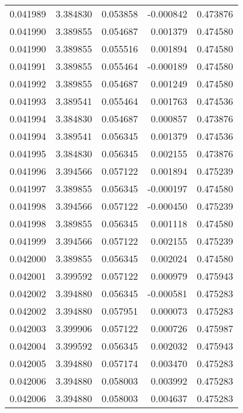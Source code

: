 \begin{tabular}{lrrrr}
0.041989    &  3.384830 &  0.053858 & -0.000842 &             0.473876 \\
0.041990    &  3.389855 &  0.054687 &  0.001379 &             0.474580 \\
0.041990    &  3.389855 &  0.055516 &  0.001894 &             0.474580 \\
0.041991    &  3.389855 &  0.055464 & -0.000189 &             0.474580 \\
0.041992    &  3.389855 &  0.054687 &  0.001249 &             0.474580 \\
0.041993    &  3.389541 &  0.055464 &  0.001763 &             0.474536 \\
0.041994    &  3.384830 &  0.054687 &  0.000857 &             0.473876 \\
0.041994    &  3.389541 &  0.056345 &  0.001379 &             0.474536 \\
0.041995    &  3.384830 &  0.056345 &  0.002155 &             0.473876 \\
0.041996    &  3.394566 &  0.057122 &  0.001894 &             0.475239 \\
0.041997    &  3.389855 &  0.056345 & -0.000197 &             0.474580 \\
0.041998    &  3.394566 &  0.057122 & -0.000450 &             0.475239 \\
0.041998    &  3.389855 &  0.056345 &  0.001118 &             0.474580 \\
0.041999    &  3.394566 &  0.057122 &  0.002155 &             0.475239 \\
0.042000    &  3.389855 &  0.056345 &  0.002024 &             0.474580 \\
0.042001    &  3.399592 &  0.057122 &  0.000979 &             0.475943 \\
0.042002    &  3.394880 &  0.056345 & -0.000581 &             0.475283 \\
0.042002    &  3.394880 &  0.057951 &  0.000073 &             0.475283 \\
0.042003    &  3.399906 &  0.057122 &  0.000726 &             0.475987 \\
0.042004    &  3.399592 &  0.056345 &  0.002032 &             0.475943 \\
0.042005    &  3.394880 &  0.057174 &  0.003470 &             0.475283 \\
0.042006    &  3.394880 &  0.058003 &  0.003992 &             0.475283 \\
0.042006    &  3.394880 &  0.058003 &  0.004637 &             0.475283 \\

\end{tabular}
